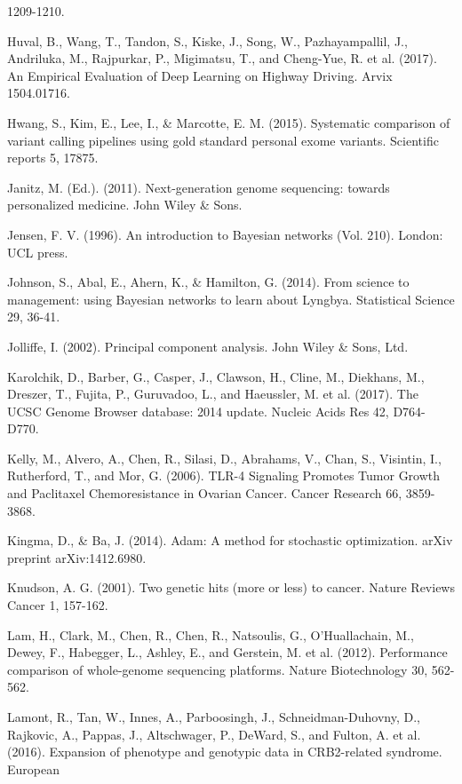 \documentclass{article}
\begin{document}
\begin{list}{}{%
\setlength{\topsep}{0pt}%
\setlength{\leftmargin}{0.5in}%
\setlength{\listparindent}{-0.5in}%
\setlength{\itemindent}{-0.5in}%
\setlength{\parsep}{\parskip}%
}
1209-1210.\\\item[] Huval, B., Wang, T., Tandon, S., Kiske, J., Song, W., Pazhayampallil, J., Andriluka, M., Rajpurkar, P., Migimatsu, T., and Cheng-Yue, R. et al. (2017). An Empirical Evaluation of Deep Learning on Highway Driving. Arvix 1504.01716.\\\item[] Hwang, S., Kim, E., Lee, I., \& Marcotte, E. M. (2015). Systematic comparison of variant calling pipelines using gold standard personal exome variants. Scientific reports 5, 17875.\\\item[] Janitz, M. (Ed.). (2011). Next-generation genome sequencing: towards personalized medicine. John Wiley \& Sons.\\\item[] Jensen, F. V. (1996). An introduction to Bayesian networks (Vol. 210). London: UCL press.\\\item[] Johnson, S., Abal, E., Ahern, K., \& Hamilton, G. (2014). From science to management: using Bayesian networks to learn about Lyngbya. Statistical Science 29, 36-41.\\\item[] Jolliffe, I. (2002). Principal component analysis. John Wiley \& Sons, Ltd.\\\item[] Karolchik, D., Barber, G., Casper, J., Clawson, H., Cline, M., Diekhans, M., Dreszer, T., Fujita, P., Guruvadoo, L., and Haeussler, M. et al. (2017). The UCSC Genome Browser database: 2014 update. Nucleic Acids Res 42, D764-D770.\\\item[] Kelly, M., Alvero, A., Chen, R., Silasi, D., Abrahams, V., Chan, S., Visintin, I., Rutherford, T., and Mor, G. (2006). TLR-4 Signaling Promotes Tumor Growth and Paclitaxel Chemoresistance in Ovarian Cancer. Cancer Research 66, 3859-3868.\\\item[] Kingma, D., \& Ba, J. (2014). Adam: A method for stochastic optimization. arXiv preprint arXiv:1412.6980.\\\item[] Knudson, A. G. (2001). Two genetic hits (more or less) to cancer. Nature Reviews Cancer 1, 157-162.\\\item[] Lam, H., Clark, M., Chen, R., Chen, R., Natsoulis, G., O'Huallachain, M., Dewey, F., Habegger, L., Ashley, E., and Gerstein, M. et al. (2012). Performance comparison of whole-genome sequencing platforms. Nature Biotechnology 30, 562-562.\\\item[] Lamont, R., Tan, W., Innes, A., Parboosingh, J., Schneidman-Duhovny, D., Rajkovic, A., Pappas, J., Altschwager, P., DeWard, S., and Fulton, A. et al. (2016). Expansion of phenotype and genotypic data in CRB2-related syndrome. European 
\end{list}
\end{document}
